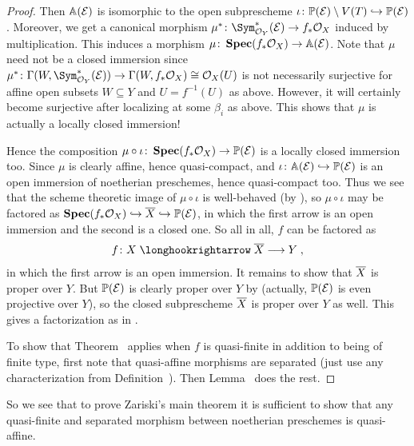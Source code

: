 \documentclass[a4paper,parskip=half,numbers=enddot, DIV=12]{scrreprt}
\begin{document}
\begin{proof}
	Then $\mathbb{A}(\mathcal{E})$ is isomorphic to the open subprescheme $\iota\colon \IP(\Ee)\setminus V(T)\monomorphism \IP(\Ee)$. Moreover, we get a canonical morphism $\mu^*\colon \Sym_{\Oo_Y}^*(\Ee)\morphism f_*\Oo_X$ induced by multiplication. This induces a morphism $\mu\colon \SPEC(f_*\Oo_X)\morphism\IA(\Ee)$. Note that $\mu$ need not be a closed immersion since $\mu^*\colon \Gamma(W,\Sym_{\Oo_Y}^*(\Ee))\morphism\Gamma(W,f_*\Oo_X)\cong \Oo_X(U)$ is not necessarily surjective for affine open subsets $W\subseteq Y$ and $U=f^{-1}(U)$ as above. However, it will certainly become surjective after localizing at some $\beta_i$ as above. This shows that $\mu$ is actually a locally closed immersion!
	
	Hence the composition $\mu\circ\iota\colon \SPEC(f_*\Oo_X)\morphism \IP(\Ee)$ is a locally closed immersion too. Since $\mu$ is clearly affine, hence quasi-compact, and $\iota\colon \IA(\Ee)\monomorphism \IP(\Ee)$ is an open immersion of noetherian preschemes, hence quasi-compact too.  Thus we see that the scheme theoretic image of $\mu\circ\iota$ is well-behaved (by \cite[]{stacks-project}), so $\mu\circ\iota$ may be factored as $\SPEC(f_*\Oo_X)\monomorphism \ov{X}\monomorphism\IP(\Ee)$, in which the first arrow is an open immersion and the second is a closed one. So all in all, $f$ can be factored as 
	\begin{align*}
		f\colon X\monomorphism\ov{X}\morphism Y\;,
	\end{align*}
	in which the first arrow is an open immersion. It remains to show that $\overline{X}$ is proper over $Y$. But $\mathbb{P}(\mathcal{E})$ is clearly proper over $Y$ by \cite[Proposition~2.4.2]{alggeo2} (actually, $\mathbb{P}(\mathcal{E})$ is even projective over $Y$), so the closed subprescheme $\overline{X}$ is proper over $Y$ as well. This gives a factorization as in .
	
	To show that Theorem~ applies when $f$ is quasi-finite in addition to being of finite type, first note that quasi-affine morphisms are separated (just use any characterization from Definition~). Then Lemma~ does the rest.
\end{proof}
So we see that to prove Zariski's main theorem it is sufficient to show that any quasi-finite and separated morphism between noetherian preschemes is quasi-affine.%
\end{document}
